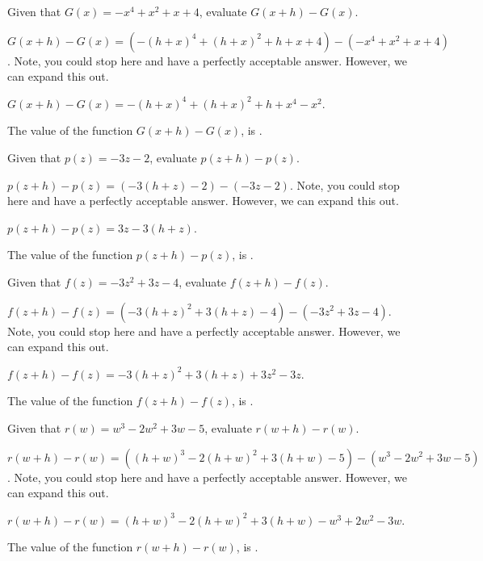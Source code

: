 \begin{shuffle} %
\begin{exercise}
Given that $G(x)=-x^4+x^2+x+4$, evaluate $G(x+h)-G(x)$.
\begin{solution}
\begin{hint}
$G(x+h)-G(x)=(-(h+x)^4+(h+x)^2+h+x+4)-(-x^4+x^2+x+4)$. Note, you could stop here and have a perfectly acceptable answer. However, we can expand this out.
\end{hint}
\begin{hint}
$G(x+h)-G(x)=-(h+x)^4+(h+x)^2+h+x^4-x^2$.
\end{hint}
The value of the function $G(x+h)-G(x)$, is .
\end{solution}
\end{exercise}

\begin{exercise}
Given that $p(z)=-3 z-2$, evaluate $p(z+h)-p(z)$.
\begin{solution}
\begin{hint}
$p(z+h)-p(z)=(-3 (h+z)-2)-(-3 z-2)$. Note, you could stop here and have a perfectly acceptable answer. However, we can expand this out.
\end{hint}
\begin{hint}
$p(z+h)-p(z)=3 z-3 (h+z)$.
\end{hint}
The value of the function $p(z+h)-p(z)$, is .
\end{solution}
\end{exercise}

\begin{exercise}
Given that $f(z)=-3 z^2+3 z-4$, evaluate $f(z+h)-f(z)$.
\begin{solution}
\begin{hint}
$f(z+h)-f(z)=(-3 (h+z)^2+3 (h+z)-4)-(-3 z^2+3 z-4)$. Note, you could stop here and have a perfectly acceptable answer. However, we can expand this out.
\end{hint}
\begin{hint}
$f(z+h)-f(z)=-3 (h+z)^2+3 (h+z)+3 z^2-3 z$.
\end{hint}
The value of the function $f(z+h)-f(z)$, is .
\end{solution}
\end{exercise}

\begin{exercise}
Given that $r(w)=w^3-2 w^2+3 w-5$, evaluate $r(w+h)-r(w)$.
\begin{solution}
\begin{hint}
$r(w+h)-r(w)=((h+w)^3-2 (h+w)^2+3 (h+w)-5)-(w^3-2 w^2+3 w-5)$. Note, you could stop here and have a perfectly acceptable answer. However, we can expand this out.
\end{hint}
\begin{hint}
$r(w+h)-r(w)=(h+w)^3-2 (h+w)^2+3 (h+w)-w^3+2 w^2-3 w$.
\end{hint}
The value of the function $r(w+h)-r(w)$, is .
\end{solution}
\end{exercise}


\end{shuffle}
